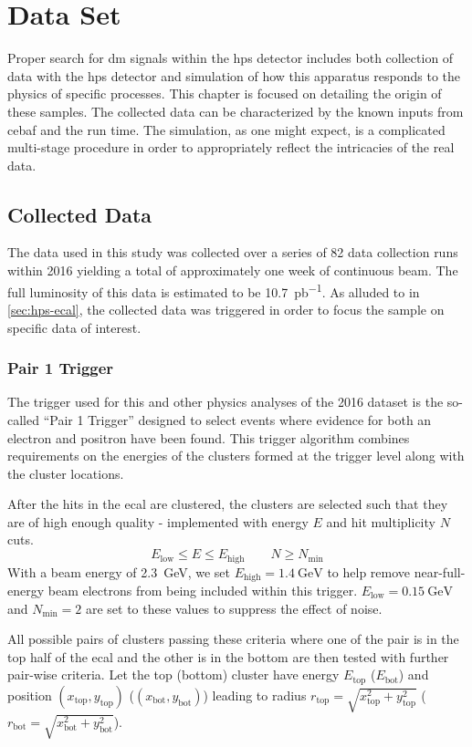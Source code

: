 \chapter{Data Set}
\label{chapter:hps:dataset}

Proper search for \ac{dm} signals within the \ac{hps} detector includes both collection of data
with the \ac{hps} detector and simulation of how this apparatus responds to the physics of specific
processes. This chapter is focused on detailing the origin of these samples. The collected data can
be characterized by the known inputs from \ac{cebaf} and the run time. The simulation, as one might
expect, is a complicated multi-stage procedure in order to appropriately reflect the intricacies of
the real data.

\section{Collected Data} \label{sec:hps:data}
The data used in this study was collected over a series of 82 data collection runs within 2016
yielding a total of approximately one week of continuous beam.
The full luminosity of this data is estimated to be \qty{10.7}{pb^{-1}}.
As alluded to in \cref{sec:hps-ecal}, the collected data was triggered in order to focus the sample on
specific data of interest.

\subsection{Pair 1 Trigger} \label{sec:hps:data:trigger}
The trigger used for this and other physics analyses of the 2016 dataset is the so-called ``Pair 1 Trigger''
designed to select events where evidence for both an electron and positron have been found.
This trigger algorithm combines requirements on the energies of the clusters formed at the trigger
level along with the cluster locations.

After the hits in the \ac{ecal} are clustered, the clusters are selected such that they are of
high enough quality - implemented with energy $E$ and hit multiplicity $N$ cuts.
$$
  E_\mathrm{low} \leq E \leq E_\mathrm{high} \qquad N \geq N_\mathrm{min}
$$
With a beam energy of \qty{2.3}{\GeV}, we set $E_\mathrm{high}=\qty{1.4}{\GeV}$ to help remove
near-full-energy beam electrons from being included within this trigger.
$E_\mathrm{low} = \qty{0.15}{\GeV}$ and $N_\mathrm{min}=2$ are set to these values to suppress
the effect of noise.

All possible pairs of clusters passing these criteria where one of the pair is in the top half of
the \ac{ecal} and the other is in the bottom are then tested with further pair-wise criteria.
Let the top (bottom) cluster have energy $E_\mathrm{top}$ ($E_\mathrm{bot}$) and position
$(x_\mathrm{top},y_\mathrm{top})$ ($(x_\mathrm{bot},y_\mathrm{bot})$) leading to radius
$r_\mathrm{top} = \sqrt{x_\mathrm{top}^2+y_\mathrm{top}^2}$
($r_\mathrm{bot} = \sqrt{x_\mathrm{bot}^2+y_\mathrm{bot}^2}$).


